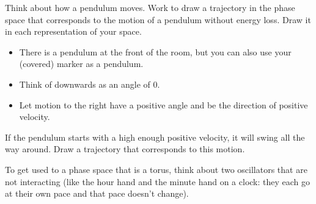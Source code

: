 \documentclass[12pt,letterpaper,noanswers]{exam}
\begin{document}
\begin{questions}
\begin{parts}
Think about how a pendulum moves.  Work to draw a trajectory in the phase space that corresponds to the motion of a pendulum without energy loss.  Draw it in each representation of your space.

\begin{itemize}
    \item There is a pendulum at the front of the room, but you can also use your (covered) marker as a pendulum.  
    \item Think of downwards as an angle of $0$.
    \item Let motion to the right have a positive angle and be the direction of positive velocity.
\end{itemize}

\item If the pendulum starts with a high enough positive velocity, it will swing all the way around.  Draw a trajectory that corresponds to this motion.


\end{parts}

\question To get used to a phase space that is a torus, think about two oscillators that are not interacting (like the hour hand and the minute hand on a clock: they each go at their own pace and that pace doesn't change).




\end{questions}
\end{document}
